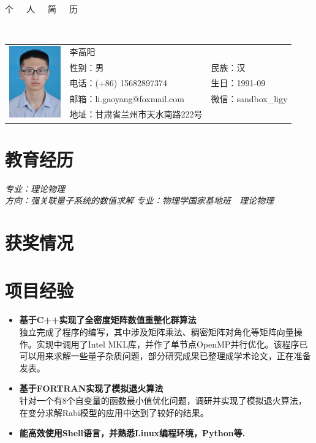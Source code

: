 \documentclass{resume}
\begin{document}

\begin{center}
\Huge{个~~~人~~~简~~~历}
\end{center}
\\
\Large{
  \begin{tabu}{ c l l }
    &
   \scshape{李高阳} &  \\
    & 性别：男 & 民族：汉 \\
    & 电话：(+86) 15682897374 & 生日：1991-09 \\
    & 邮箱：li.gaoyang@foxmail.com & 微信：sandbox\_ligy\\
    & 地址：甘肃省兰州市天水南路222号 \hspace{40} & %
  \end{tabu}
}

\section{教育经历}
\textit{专业：理论物理}\\
\textit{方向：强关联量子系统的数值求解}
\textit{专业：物理学国家基地班\ \ 理论物理}

\section{获奖情况}

\section{项目经验}
\begin{itemize}%
\item \textbf{基于C++实现了全密度矩阵数值重整化群算法}\\
独立完成了程序的编写，其中涉及矩阵乘法、稠密矩阵对角化等矩阵向量操作。实现中调用了Intel MKL库，并作了单节点OpenMP并行优化。该程序已可以用来求解一些量子杂质问题，部分研究成果已整理成学术论文，正在准备发表。
\item \textbf{基于FORTRAN实现了模拟退火算法}\\
针对一个有8个自变量的函数最小值优化问题，调研并实现了模拟退火算法，在变分求解Rabi模型的应用中达到了较好的结果。
\item \textbf{能高效使用Shell语言，并熟悉Linux编程环境，Python等.}
\end{itemize}
\end{document}
